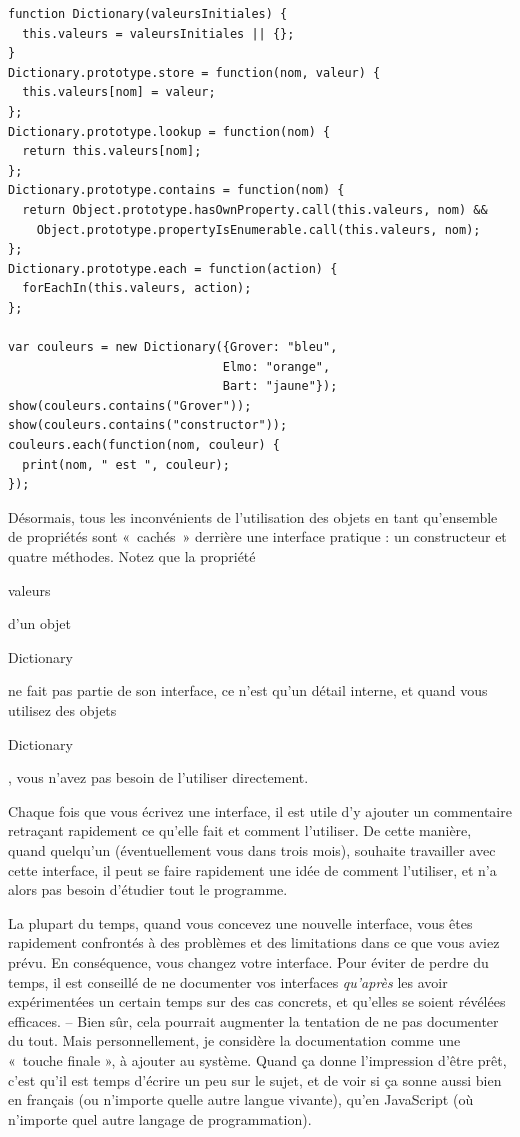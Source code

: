 \documentclass{FramateX}
\renewcommand{\texttt}[1]{\begin{sffamily}{#1}\end{sffamily}}
\begin{document}
\begin{lstlisting}
function Dictionary(valeursInitiales) {
  this.valeurs = valeursInitiales || {};
}
Dictionary.prototype.store = function(nom, valeur) {
  this.valeurs[nom] = valeur;
};
Dictionary.prototype.lookup = function(nom) {
  return this.valeurs[nom];
};
Dictionary.prototype.contains = function(nom) {
  return Object.prototype.hasOwnProperty.call(this.valeurs, nom) &&
    Object.prototype.propertyIsEnumerable.call(this.valeurs, nom);
};
Dictionary.prototype.each = function(action) {
  forEachIn(this.valeurs, action);
};

var couleurs = new Dictionary({Grover: "bleu",
                              Elmo: "orange",
                              Bart: "jaune"});
show(couleurs.contains("Grover"));
show(couleurs.contains("constructor"));
couleurs.each(function(nom, couleur) {
  print(nom, " est ", couleur);
});
\end{lstlisting}
Désormais, tous les inconvénients de l'utilisation des objets en tant
qu'ensemble de propriétés sont «~cachés~» derrière une interface
pratique : un constructeur et quatre méthodes. Notez que la propriété
\texttt{valeurs} d'un objet \texttt{Dictionary} ne fait pas partie de
son interface, ce n'est qu'un détail interne, et quand vous utilisez des
objets \texttt{Dictionary}, vous n'avez pas besoin de l'utiliser
directement.

Chaque fois que vous écrivez une interface, il est utile d'y ajouter un
commentaire retraçant rapidement ce qu'elle fait et comment l'utiliser.
De cette manière, quand quelqu'un (éventuellement vous dans trois mois),
souhaite travailler avec cette interface, il peut se faire rapidement
une idée de comment l'utiliser, et n'a alors pas besoin d'étudier tout
le programme.

La plupart du temps, quand vous concevez une nouvelle interface, vous
êtes rapidement confrontés à des problèmes et des limitations dans ce
que vous aviez prévu. En conséquence, vous changez votre interface. Pour
éviter de perdre du temps, il est conseillé de ne documenter vos
interfaces \emph{qu'après} les avoir expérimentées un certain temps sur
des cas concrets, et qu'elles se soient révélées efficaces. -- Bien sûr,
cela pourrait augmenter la tentation de ne pas documenter du tout. Mais
personnellement, je considère la documentation comme une «~touche finale
», à ajouter au système. Quand ça donne l'impression d'être prêt, c'est
qu'il est temps d'écrire un peu sur le sujet, et de voir si ça sonne
aussi bien en français (ou n'importe quelle autre langue vivante), qu'en
JavaScript (où n'importe quel autre langage de programmation).
\end{document}

